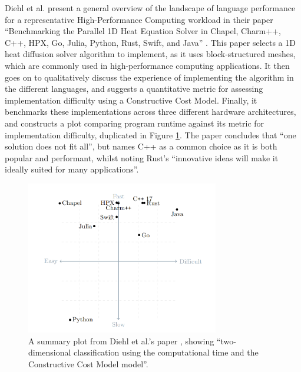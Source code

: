 Diehl et al. present a general overview of the landscape of language performance for a representative High-Performance Computing workload in their paper ``Benchmarking the Parallel 1D Heat Equation Solver in Chapel, Charm++, C++, HPX, Go, Julia, Python, Rust, Swift, and Java'' \cite{diehlBenchmarkingParallel1D2023}. This paper selects a 1D heat diffusion solver algorithm to implement, as it uses block-structured meshes, which are commonly used in high-performance computing applications. It then goes on to qualitatively discuss the experience of implementing the algorithm in the different languages, and suggests a quantitative metric for assessing implementation difficulty using a Constructive Cost Model. Finally, it benchmarks these implementations across three different hardware architectures, and constructs a plot comparing program runtime against its metric for implementation difficulty, duplicated in Figure \ref{fig:1d_heat_results}. The paper concludes that ``one solution does not fit all'', but names C++ as a common choice as it is both popular and performant, whilst noting Rust's ``innovative ideas will make it ideally suited for many applications''.

\begin{figure}[H]
    \centering
    \includegraphics[width=0.75\textwidth]{images/2_background/1d_heat_results.png}
    \caption{A summary plot from Diehl et al.'s paper \cite{diehlBenchmarkingParallel1D2023}, showing ``two-dimensional classification using the computational time and the Constructive Cost Model model''.}
    \label{fig:1d_heat_results}
\end{figure}

